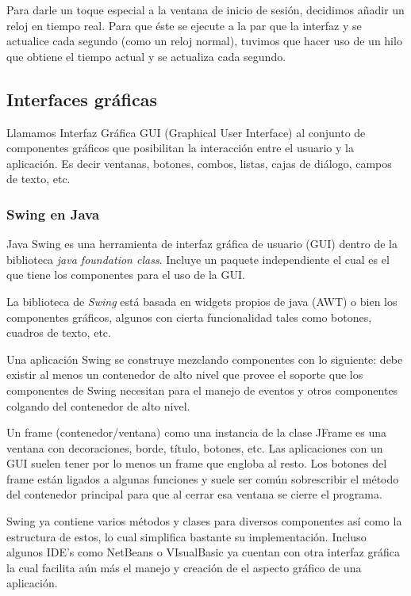 \documentclass[12pt]{article}
\begin{document}
\par Para darle un toque especial a la ventana de inicio de sesión, decidimos añadir un reloj en tiempo real. Para que éste se ejecute a la par que la interfaz y se actualice cada segundo (como un reloj normal), tuvimos que hacer uso de un hilo que obtiene el tiempo actual y se actualiza cada segundo.

\subsection{Interfaces gráficas}
Llamamos Interfaz Gráfica GUI (Graphical User Interface) al conjunto de componentes gráficos que posibilitan la interacción entre el usuario y la aplicación. Es decir ventanas, botones, combos, listas, cajas de diálogo, campos de texto, etc.

\subsubsection{Swing en Java}
Java Swing es una herramienta de interfaz gráfica de usuario (GUI) dentro de la biblioteca \textit{java foundation class}. Incluye un paquete independiente el cual es el que tiene los componentes para el uso de la GUI. 

\par La biblioteca de \textit{Swing} está basada en widgets propios de java (AWT) o bien los componentes gráficos, algunos con cierta funcionalidad tales como botones, cuadros de texto, etc. 

\par Una aplicación Swing se construye mezclando componentes con lo siguiente: debe existir al menos un contenedor de alto nivel que provee el soporte que los componentes de Swing necesitan para el manejo de eventos y otros componentes colgando del contenedor de alto nivel. 

\par Un frame (contenedor/ventana) como una instancia de la clase JFrame es una ventana con decoraciones, borde, título, botones, etc. Las aplicaciones con un GUI suelen tener por lo menos un frame que engloba al resto. Los botones del frame están ligados a algunas funciones y suele ser común sobrescribir el método del contenedor principal para que al cerrar esa ventana se cierre el programa. 

\par Swing ya contiene varios métodos y clases para diversos componentes así como la estructura de estos, lo cual simplifica bastante su implementación. Incluso algunos IDE's como NetBeans o VIsualBasic ya cuentan con otra interfaz gráfica la cual facilita aún más el manejo y creación de el aspecto gráfico de una aplicación. 
\end{document}
